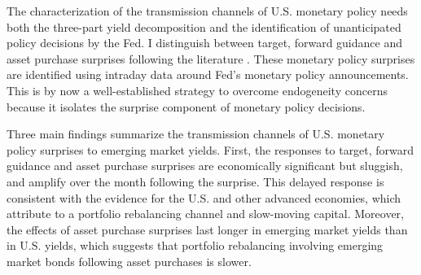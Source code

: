 {The characterization of the transmission channels of U.S. monetary policy needs both the three-part yield decomposition and the identification of unanticipated policy decisions by the Fed.
I distinguish between target, forward guidance and asset purchase surprises following the literature \citep{Kuttner:2001,GSS:2005a,Swanson:2018}. 
These monetary policy surprises 
are identified using intraday data around Fed's monetary policy announcements. %
This is by now a well-established strategy %
to overcome endogeneity concerns because it isolates the surprise component of monetary policy decisions.

Three main findings summarize the transmission channels of U.S. monetary policy surprises to emerging market yields.
First, the responses to target, forward guidance and asset purchase surprises are economically significant but sluggish, and amplify over the month following the surprise. This delayed response is consistent with the evidence for the U.S. and other advanced economies, which \cite{BrooksKatzLustig:2019} attribute to a portfolio rebalancing channel and %
slow-moving capital. 
Moreover, the effects of %
asset purchase surprises last longer in emerging market yields than in U.S. yields, which suggests that portfolio rebalancing involving emerging market bonds following asset purchases is slower.

}

